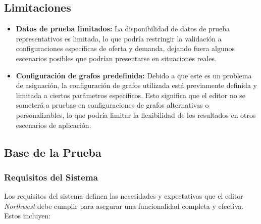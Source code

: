 \documentclass[stu, 12pt, letterpaper, donotrepeattitle, floatsintext, natbib]{apa7}
\begin{document}
\subsection{Limitaciones}

\begin{itemize}
    \item \textbf{Datos de prueba limitados:} La disponibilidad de datos de prueba representativos es limitada, lo que podría restringir la validación a configuraciones específicas de oferta y demanda, dejando fuera algunos escenarios posibles que podrían presentarse en situaciones reales.

    \item \textbf{Configuración de grafos predefinida:} Debido a que este es un problema de asignación, la configuración de grafos utilizada está previamente definida y limitada a ciertos parámetros específicos. Esto significa que el editor no se someterá a pruebas en configuraciones de grafos alternativas o personalizables, lo que podría limitar la flexibilidad de los resultados en otros escenarios de aplicación.
\end{itemize}

\subsection{Base de la Prueba}

\subsubsection{Requisitos del Sistema}
Los requisitos del sistema definen las necesidades y expectativas que el editor \textit{Northwest} debe cumplir para asegurar una funcionalidad completa y efectiva. Estos incluyen:
\end{document}

